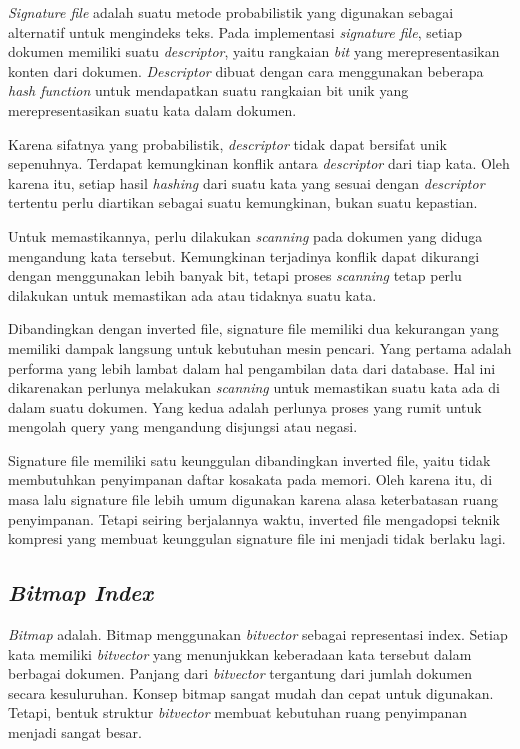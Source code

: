 \emph{Signature file} adalah suatu metode probabilistik yang digunakan sebagai
alternatif untuk mengindeks teks. Pada implementasi \emph{signature file},
setiap dokumen memiliki suatu \emph{descriptor}, yaitu rangkaian \emph{bit} yang
merepresentasikan konten dari dokumen. \emph{Descriptor} dibuat dengan cara
menggunakan beberapa \emph{hash function} untuk mendapatkan suatu rangkaian bit
unik yang merepresentasikan suatu kata dalam dokumen. 

Karena sifatnya yang probabilistik, \emph{descriptor} tidak dapat bersifat unik
sepenuhnya. Terdapat kemungkinan konflik antara \emph{descriptor} dari tiap
kata. Oleh karena itu, setiap hasil \emph{hashing} dari suatu kata yang sesuai
dengan \emph{descriptor} tertentu perlu diartikan sebagai suatu kemungkinan,
bukan suatu kepastian.

Untuk memastikannya, perlu dilakukan \emph{scanning} pada dokumen yang diduga
mengandung kata tersebut. Kemungkinan terjadinya konflik dapat dikurangi dengan
menggunakan lebih banyak bit, tetapi proses \emph{scanning} tetap perlu
dilakukan untuk memastikan ada atau tidaknya suatu kata.

Dibandingkan dengan inverted file, signature file memiliki dua kekurangan yang
memiliki dampak langsung untuk kebutuhan mesin pencari. Yang pertama adalah
performa yang lebih lambat dalam hal pengambilan data dari database. Hal ini
dikarenakan perlunya melakukan \emph{scanning} untuk memastikan suatu kata ada
di dalam suatu dokumen. Yang kedua adalah perlunya proses yang rumit untuk
mengolah query yang mengandung disjungsi atau negasi.

Signature file memiliki satu keunggulan dibandingkan inverted file, yaitu tidak
membutuhkan penyimpanan daftar kosakata pada memori. Oleh karena itu, di masa
lalu signature file lebih umum digunakan karena alasa keterbatasan ruang
penyimpanan. Tetapi seiring berjalannya waktu, inverted file mengadopsi teknik
kompresi yang membuat keunggulan signature file ini menjadi tidak berlaku lagi.

\subsection{\emph{Bitmap Index}}

\emph{Bitmap} adalah. Bitmap menggunakan \emph{bitvector} sebagai representasi
index. Setiap kata memiliki \emph{bitvector} yang menunjukkan keberadaan kata
tersebut dalam berbagai dokumen. Panjang dari \emph{bitvector} tergantung dari
jumlah dokumen secara kesuluruhan. Konsep bitmap sangat mudah dan cepat untuk
digunakan. Tetapi, bentuk struktur \emph{bitvector} membuat kebutuhan ruang
penyimpanan menjadi sangat besar.

